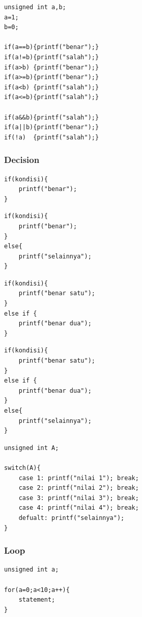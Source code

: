 \documentclass[12pt,]{article}
\begin{document}
	\begin{verbatim}
unsigned int a,b;
a=1;
b=0;

if(a==b){printf("benar");}
if(a!=b){printf("salah");}
if(a>b) {printf("benar");}
if(a>=b){printf("benar");}
if(a<b) {printf("salah");}
if(a<=b){printf("salah");}

if(a&&b){printf("salah");}
if(a||b){printf("benar");}
if(!a)  {printf("salah");}
	\end{verbatim}

	\subsubsection{Decision}
	\begin{verbatim}
if(kondisi){
	printf("benar");
}
	\end{verbatim}

	\begin{verbatim}
if(kondisi){
	printf("benar");
}
else{
	printf("selainnya");
}
	\end{verbatim}

	\begin{verbatim}
if(kondisi){
	printf("benar satu");
}
else if {
	printf("benar dua");
}
	\end{verbatim}

	\begin{verbatim}
if(kondisi){
	printf("benar satu");
}
else if {
	printf("benar dua");
}
else{
	printf("selainnya");
}
	\end{verbatim}

	\begin{verbatim}
unsigned int A;

switch(A){
	case 1: printf("nilai 1"); break;
	case 2: printf("nilai 2"); break;
	case 3: printf("nilai 3"); break;
	case 4: printf("nilai 4"); break;
	defualt: printf("selainnya");
}
	\end{verbatim}

	\subsubsection{Loop}

	\begin{verbatim}
unsigned int a;

for(a=0;a<10;a++){
	statement;
}
	\end{verbatim}
\end{document}
